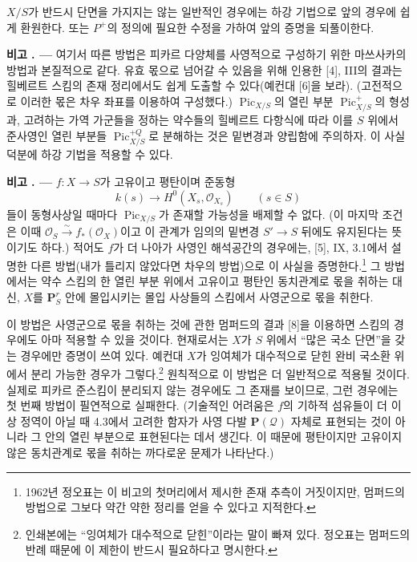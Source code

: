 \documentclass[11pt,twoside,openany]{book}
\numberwithin{equation}{section}
\newcommand{\sourceunit}{front}
\newcommand{\src}[1]{%
  \phantomsection\hypertarget{src:\sourceunit:#1}{}%
  \marginpar{\raggedleft\footnotesize\sffamily #1}%
}
\theoremstyle{plain}
\theoremstyle{definition}
\theoremstyle{remark}
\newcommand{\result}[2]{%
  \par\medskip\noindent\textbf{#1%
  \if\relax\detokenize{#2}\relax\else\space#2\fi. ---}\enspace
}
\begin{document}
$X/S$가 반드시 단면을 가지지는 않는 일반적인 경우에는 하강 기법으로
앞의 경우에 쉽게 환원한다. 또는 $P^+$의 정의에 필요한 수정을 가하여
앞의 증명을 되풀이한다.

\result{비고}{5.1} 여기서 따른 방법은 피카르 다양체를 사영적으로 구성하기
위한 마쓰사카의 방법과 본질적으로 같다. 유효 몫으로 넘어갈 수 있음을 위해
인용한 [4], III의 결과는 힐베르트 스킴의 존재 정리에서도 쉽게 도출할 수
있다(예컨대 [6]을 보라). (고전적으로 이러한 몫은 차우 좌표를 이용하여
구성했다.) $\operatorname{Pic}_{X/S}$의 열린 부분
$\operatorname{Pic}^{+}_{X/S}$의 형성과, 고려하는 가역 가군들을 정하는
약수들의 힐베르트 다항식에 따라 이를 $S$ 위에서 준사영인 열린 부분들
$\operatorname{Pic}^{+Q}_{X/S}$로 분해하는 것은 밑변경과 양립함에
주의하자. 이 사실 덕분에 하강 기법을 적용할 수 있다.

\result{비고}{5.2} $f:X\longrightarrow S$가 고유이고 평탄이며 준동형
\[
k(s)\longrightarrow H^0(X_s,\mathcal O_{X_s})\qquad(s\in S)
\]
들이 동형사상일 때마다 $\operatorname{Pic}_{X/S}$가 존재할 가능성을
배제할 수 없다. (이 마지막 조건은 이때
$\mathcal O_S\xrightarrow{\sim}f_*(\mathcal O_X)$이고 이 관계가 임의의
밑변경 $S'\longrightarrow S$ 뒤에도 유지된다는 뜻이기도 하다.) 적어도
$f$가 더 나아가 사영인 해석공간의 경우에는, [5], IX, 3.1에서 설명한
다른 방법(내가 틀리지 않았다면 차우의 방법)으로 이 사실을
증명한다.\footnote{1962년 정오표는 이 비고의 첫머리에서 제시한 존재
추측이 거짓이지만, 멈퍼드의 방법으로 그보다 약간 약한 정리를 얻을 수
있다고 지적한다.} 그 방법에서는 약수 스킴의 한 열린 부분 위에서 고유이고
평탄인 동치관계로 몫을 취하는 대신, $X$를 $\mathbf P^r_S$ 안에
몰입시키는 몰입 사상들의 스킴에서 사영군으로 몫을 취한다.

\src{156}
이 방법은 사영군으로 몫을 취하는 것에 관한 멈퍼드의 결과 [8]을 이용하면
스킴의 경우에도 아마 적용할 수 있을 것이다. 현재로서는 $X$가 $S$ 위에서
``많은 국소 단면''을 갖는 경우에만 증명이 쓰여 있다. 예컨대 $X$가
잉여체가 대수적으로 닫힌 완비 국소환 위에서 분리 가능한 경우가
그렇다.\footnote{인쇄본에는 ``잉여체가 대수적으로 닫힌''이라는 말이
빠져 있다. 정오표는 멈퍼드의 반례 때문에 이 제한이 반드시 필요하다고
명시한다.} 원칙적으로 이 방법은 더 일반적으로 적용될 것이다. 실제로
피카르 준스킴이 분리되지 않는 경우에도 그 존재를 보이므로, 그런 경우에는
첫 번째 방법이 필연적으로 실패한다. (기술적인 어려움은 $f$의 기하적
섬유들이 더 이상 정역이 아닐 때 4.3에서 고려한 함자가 사영 다발
$\mathbf P(\mathcal Q)$ 자체로 표현되는 것이 아니라 그 안의 열린 부분으로
표현된다는 데서 생긴다. 이 때문에 평탄이지만 고유이지 않은 동치관계로
몫을 취하는 까다로운 문제가 나타난다.)
\end{document}

